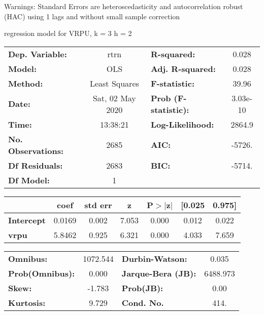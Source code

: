 Warnings: \newline
 [1] Standard Errors are heteroscedasticity and autocorrelation robust (HAC) using 1 lags and without small sample correction\ 

regression model for VRPU, k = 3 h = 2\begin{center}
\begin{tabular}{lclc}
\toprule
\textbf{Dep. Variable:}    &       rtrn       & \textbf{  R-squared:         } &     0.028   \\
\textbf{Model:}            &       OLS        & \textbf{  Adj. R-squared:    } &     0.028   \\
\textbf{Method:}           &  Least Squares   & \textbf{  F-statistic:       } &     39.96   \\
\textbf{Date:}             & Sat, 02 May 2020 & \textbf{  Prob (F-statistic):} &  3.03e-10   \\
\textbf{Time:}             &     13:38:21     & \textbf{  Log-Likelihood:    } &    2864.9   \\
\textbf{No. Observations:} &        2685      & \textbf{  AIC:               } &    -5726.   \\
\textbf{Df Residuals:}     &        2683      & \textbf{  BIC:               } &    -5714.   \\
\textbf{Df Model:}         &           1      & \textbf{                     } &             \\
\bottomrule
\end{tabular}
\begin{tabular}{lcccccc}
                   & \textbf{coef} & \textbf{std err} & \textbf{z} & \textbf{P$> |$z$|$} & \textbf{[0.025} & \textbf{0.975]}  \\
\midrule
\textbf{Intercept} &       0.0169  &        0.002     &     7.053  &         0.000        &        0.012    &        0.022     \\
\textbf{vrpu}      &       5.8462  &        0.925     &     6.321  &         0.000        &        4.033    &        7.659     \\
\bottomrule
\end{tabular}
\begin{tabular}{lclc}
\textbf{Omnibus:}       & 1072.544 & \textbf{  Durbin-Watson:     } &    0.035  \\
\textbf{Prob(Omnibus):} &   0.000  & \textbf{  Jarque-Bera (JB):  } & 6488.973  \\
\textbf{Skew:}          &  -1.783  & \textbf{  Prob(JB):          } &     0.00  \\
\textbf{Kurtosis:}      &   9.729  & \textbf{  Cond. No.          } &     414.  \\
\bottomrule
\end{tabular}
\end{center}

